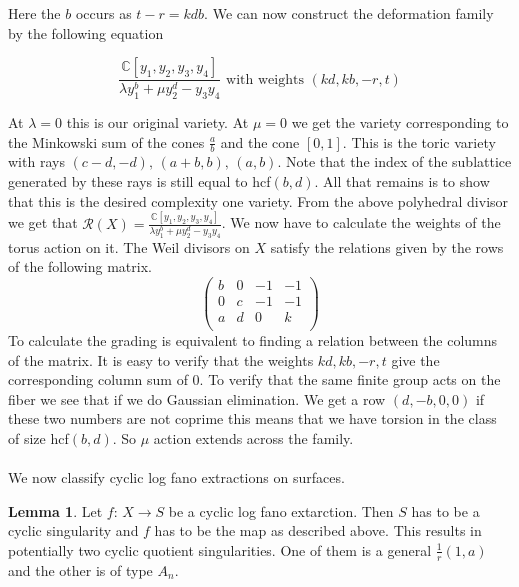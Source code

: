 \documentclass[11pt]{report}
\theoremstyle{definition}
\theoremstyle{definition}
\theoremstyle{definition}
\theoremstyle{definition}
\theoremstyle{definition}
\newtheorem{lem}[thm]{Lemma}
\theoremstyle{definition}
\theoremstyle{definition}
\theoremstyle{definition}
\begin{document}
Here the $b$ occurs as $t-r = kdb$. We can now construct the deformation family by the following equation

\[
\frac{\mathbb{C}[y_1, y_2, y_3,  y_4]}{\lambda y_1^b  + \mu y_2^d - y_3 y_4} \text{  with weights } (kd, kb, -r, t)
\]

At $\lambda = 0$ this is our original variety. At $\mu = 0$ we get the variety corresponding to the Minkowski sum of the cones $\frac{a}{b}$ and the cone $\left[ 0, 1 \right]$. This is the toric variety with rays $(c-d,-d), \, (a+b, b), \, (a,b)$. Note that the index of the sublattice generated by these rays is still equal to hcf$(b, d)$. All that remains is to show that this is the desired complexity one variety. From the above polyhedral divisor we get that $\mathcal{R}(X) =\frac{\mathbb{C}[y_1, y_2, y_3,  y_4]}{\lambda y_1^b  + \mu y_2^d - y_3 y_4}$. We now have to calculate the weights of the torus action on it. The Weil divisors on $X$ satisfy the relations given by the rows of the following matrix. 
\[
 \left(
 \begin{array}{cccc}
b & 0 & -1 & -1  \\
0 & c & -1 & -1 \\
a & d & 0  & k \\
\end{array}
\right) 
\]
To calculate the grading is equivalent to finding a relation between the columns of the matrix. It is easy to verify that the weights $kd,kb,-r,t$ give the corresponding column sum of 0. To verify that the same finite group acts on the fiber we see that if we do Gaussian elimination. We get a row $(d, -b, 0 ,0)$ if these two numbers are not coprime this means that we have torsion in the class of size hcf$(b,d)$. So $\mathbb{\mu}$ action extends across the family. 
\\
\\
We now classify cyclic log fano extractions on surfaces.
\begin{lem}
Let $f: \, X \rightarrow S$ be a cyclic log fano extarction. Then $S$ has to be a cyclic singularity and $f$ has to be the map as described above. This results in potentially two cyclic quotient singularities. One of them is a general $\frac{1}{r} (1, a)$ and the other is of type $A_n$.
\end{lem}
\end{document}
